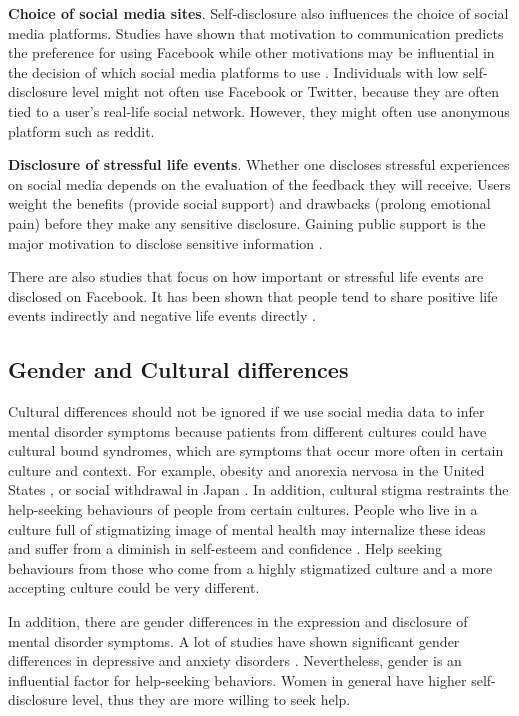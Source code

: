 \textbf{Choice of social media sites}. Self-disclosure also influences the choice of social media platforms. Studies have shown that motivation to communication predicts the preference for using Facebook while other motivations may be influential in the decision of which social media platforms to use \cite{jenkins2012relationships}. Individuals with low self-disclosure level might not often use Facebook or Twitter, because they are often tied to a user's real-life social network. However, they might often use anonymous platform such as reddit.

\textbf{Disclosure of stressful life events}. 
Whether one discloses stressful experiences on social media depends on the evaluation of the feedback they will receive. Users weight the benefits (provide social support) and drawbacks (prolong emotional pain) before they make any sensitive disclosure.  Gaining public support is the major motivation to disclose sensitive information \cite{vitak2017benefits}. 

There are also studies that focus on how important or stressful life events are disclosed on Facebook. It has been shown that people tend to share positive life events indirectly and negative life events directly \cite{bevan_how_2015}. 

\subsection{Gender and Cultural differences}
 Cultural differences should not be ignored if we use social media data to infer mental disorder symptoms because patients from different cultures could have cultural bound syndromes, which are symptoms that occur more often in certain culture and context. For example, obesity and anorexia nervosa in the United States \cite{ritenbaugh1982obesity}, or social withdrawal in Japan \cite{teo2010hikikomori}. In addition, cultural stigma restraints the help-seeking behaviours of people from certain cultures. People who live in a culture full of stigmatizing image of mental health may internalize these ideas and suffer from a diminish in self-esteem and confidence \cite{corrigan1998impact,holmes1998individual}. Help seeking behaviours from those who come from a highly stigmatized culture and a more accepting culture could be very different.

In addition, there are gender differences in the expression and disclosure of mental disorder symptoms. A lot of studies have shown significant gender differences in depressive and anxiety disorders \cite{afifi2007gender}. Nevertheless, gender is an influential factor for help-seeking behaviors. Women in general have higher self-disclosure level, thus they are more willing to seek help. 


